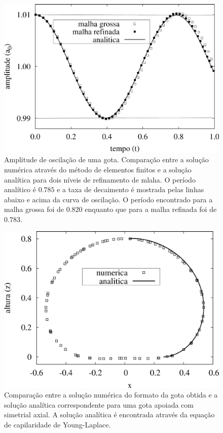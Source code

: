 \documentclass[a4paper,portuges,12pt]{article}
\begin{document}
 \begin{figure}[h!]
 	\begin{center}
 		\includegraphics[angle=0, scale=0.5]{figs/oscillating.pdf}
 	\end{center}
	\caption{Amplitude de oscilação de uma gota. Comparação entre a
	solução numérica através do método de elementos finitos e a solução
	analítica para dois níveis de refinamento de mlaha. O período
	analítico é $0.785$ e a taxa de decaimento é mostrada pelas linhas
	abaixo e acima da curva de oscilação. O período encontrado para a
	malha grossa foi de $0.820$ enquanto que para a malha refinada foi
	de $0.783$.}
 	\label{fig:oscillating} 
 \end{figure}

 \begin{figure}[h!]
 	\begin{center}
 		\includegraphics[angle=0, scale=0.5]{figs/sessileShape.pdf}
 	\end{center}
	\caption{Comparação entre a solução numérica do formato da gota
	obtida e a solução
	analítica correspondente para uma gota apoiada com simetrial axial.
	A solução analítica é encontrada através da equação de capilaridade
	de Young-Laplace.}
 	\label{fig:sessile} 
 \end{figure}
\end{document}
